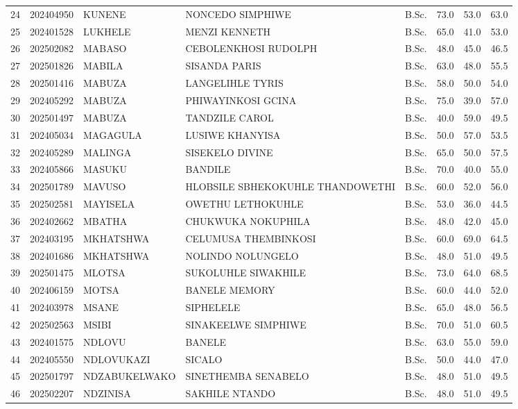 \documentclass[12pt]{article}
\begin{document}
\begin{longtable}{@{}llllllll@{}}
24 & 202404950 & KUNENE & NONCEDO SIMPHIWE & B.Sc. & 73.0 & 53.0 & 63.0 \\
25 & 202401528 & LUKHELE & MENZI KENNETH & B.Sc. & 65.0 & 41.0 & 53.0 \\
26 & 202502082 & MABASO & CEBOLENKHOSI RUDOLPH & B.Sc. & 48.0 & 45.0 & 46.5 \\
27 & 202501826 & MABILA & SISANDA PARIS & B.Sc. & 63.0 & 48.0 & 55.5 \\
28 & 202501416 & MABUZA & LANGELIHLE TYRIS & B.Sc. & 58.0 & 50.0 & 54.0 \\
29 & 202405292 & MABUZA & PHIWAYINKOSI GCINA & B.Sc. & 75.0 & 39.0 & 57.0 \\
30 & 202501497 & MABUZA & TANDZILE CAROL & B.Sc. & 40.0 & 59.0 & 49.5 \\
31 & 202405034 & MAGAGULA & LUSIWE KHANYISA & B.Sc. & 50.0 & 57.0 & 53.5 \\
32 & 202405289 & MALINGA & SISEKELO DIVINE & B.Sc. & 65.0 & 50.0 & 57.5 \\
33 & 202405866 & MASUKU & BANDILE & B.Sc. & 70.0 & 40.0 & 55.0 \\
34 & 202501789 & MAVUSO & HLOBSILE SBHEKOKUHLE THANDOWETHI & B.Sc. & 60.0 & 52.0 & 56.0 \\
35 & 202502581 & MAYISELA & OWETHU LETHOKUHLE & B.Sc. & 53.0 & 36.0 & 44.5 \\
36 & 202402662 & MBATHA & CHUKWUKA NOKUPHILA & B.Sc. & 48.0 & 42.0 & 45.0 \\
37 & 202403195 & MKHATSHWA & CELUMUSA THEMBINKOSI & B.Sc. & 60.0 & 69.0 & 64.5 \\
38 & 202401686 & MKHATSHWA & NOLINDO NOLUNGELO & B.Sc. & 48.0 & 51.0 & 49.5 \\
39 & 202501475 & MLOTSA & SUKOLUHLE SIWAKHILE & B.Sc. & 73.0 & 64.0 & 68.5 \\
40 & 202406159 & MOTSA & BANELE MEMORY & B.Sc. & 60.0 & 44.0 & 52.0 \\
41 & 202403978 & MSANE & SIPHELELE & B.Sc. & 65.0 & 48.0 & 56.5 \\
42 & 202502563 & MSIBI & SINAKEELWE SIMPHIWE & B.Sc. & 70.0 & 51.0 & 60.5 \\
43 & 202401575 & NDLOVU & BANELE & B.Sc. & 63.0 & 55.0 & 59.0 \\
44 & 202405550 & NDLOVUKAZI & SICALO & B.Sc. & 50.0 & 44.0 & 47.0 \\
45 & 202501797 & NDZABUKELWAKO & SINETHEMBA SENABELO & B.Sc. & 48.0 & 51.0 & 49.5 \\
46 & 202502207 & NDZINISA & SAKHILE NTANDO & B.Sc. & 48.0 & 51.0 & 49.5 \\

\end{longtable}
\end{document}

